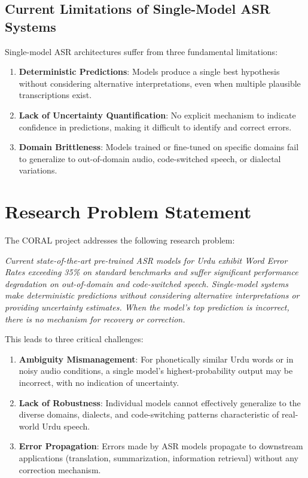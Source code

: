 \subsection{Current Limitations of Single-Model ASR Systems}

Single-model ASR architectures suffer from three fundamental limitations:

\begin{enumerate}
    \item \textbf{Deterministic Predictions}: Models produce a single best hypothesis without considering alternative interpretations, even when multiple plausible transcriptions exist.
    \item \textbf{Lack of Uncertainty Quantification}: No explicit mechanism to indicate confidence in predictions, making it difficult to identify and correct errors.
    \item \textbf{Domain Brittleness}: Models trained or fine-tuned on specific domains fail to generalize to out-of-domain audio, code-switched speech, or dialectal variations.
\end{enumerate}

\section{Research Problem Statement}

The CORAL project addresses the following research problem:

\textit{Current state-of-the-art pre-trained ASR models for Urdu exhibit Word Error Rates exceeding 35\% on standard benchmarks and suffer significant performance degradation on out-of-domain and code-switched speech. Single-model systems make deterministic predictions without considering alternative interpretations or providing uncertainty estimates. When the model's top prediction is incorrect, there is no mechanism for recovery or correction.}

This leads to three critical challenges:

\begin{enumerate}
    \item \textbf{Ambiguity Mismanagement}: For phonetically similar Urdu words or in noisy audio conditions, a single model's highest-probability output may be incorrect, with no indication of uncertainty.
    \item \textbf{Lack of Robustness}: Individual models cannot effectively generalize to the diverse domains, dialects, and code-switching patterns characteristic of real-world Urdu speech.
    \item \textbf{Error Propagation}: Errors made by ASR models propagate to downstream applications (translation, summarization, information retrieval) without any correction mechanism.
\end{enumerate}

